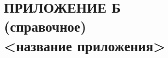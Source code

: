 \renewcommand{\thefigure}{\Asbuk{section}.\arabic{figure}}
\renewcommand{\thetable}{\Asbuk{section}.\arabic{table}}
\renewcommand{\thelstlisting}{\Asbuk{section}.\arabic{lstlisting}}

\thispagestyle{plain}
\section*{ПРИЛОЖЕНИЕ Б \\ (справочное) \\ <название приложения>}

\setcounter{section}{1}
\setcounter{figure}{0}
\setcounter{table}{0}
\setcounter{lstlisting}{0}

\pagebreak
